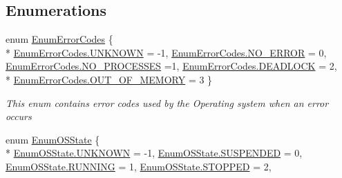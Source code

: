 \subsection*{Enumerations}
\begin{DoxyCompactItemize}
\item 
enum \hyperlink{namespace_c_p_u___o_s___simulator_1_1_operating___system_aea0b669d1bbf5690ae34ac2f8bef9470}{Enum\+Error\+Codes} \{ \\*
\hyperlink{namespace_c_p_u___o_s___simulator_1_1_operating___system_aea0b669d1bbf5690ae34ac2f8bef9470a696b031073e74bf2cb98e5ef201d4aa3}{Enum\+Error\+Codes.\+U\+N\+K\+N\+O\+W\+N} = -\/1, 
\hyperlink{namespace_c_p_u___o_s___simulator_1_1_operating___system_aea0b669d1bbf5690ae34ac2f8bef9470ad306b6fdee05fe87455110ddf6501e6c}{Enum\+Error\+Codes.\+N\+O\+\_\+\+E\+R\+R\+O\+R} = 0, 
\hyperlink{namespace_c_p_u___o_s___simulator_1_1_operating___system_aea0b669d1bbf5690ae34ac2f8bef9470a1bc8f3c5a89b2c7abbfc54ef21586aea}{Enum\+Error\+Codes.\+N\+O\+\_\+\+P\+R\+O\+C\+E\+S\+S\+E\+S} =1, 
\hyperlink{namespace_c_p_u___o_s___simulator_1_1_operating___system_aea0b669d1bbf5690ae34ac2f8bef9470a8f35b656de87c54e18710fc94d73a614}{Enum\+Error\+Codes.\+D\+E\+A\+D\+L\+O\+C\+K} = 2, 
\\*
\hyperlink{namespace_c_p_u___o_s___simulator_1_1_operating___system_aea0b669d1bbf5690ae34ac2f8bef9470ac56ddb8056b120c9d5fee05981f219c6}{Enum\+Error\+Codes.\+O\+U\+T\+\_\+\+O\+F\+\_\+\+M\+E\+M\+O\+R\+Y} = 3
 \}\begin{DoxyCompactList}\small\item\em This enum contains error codes used by the Operating system when an error occurs \end{DoxyCompactList}
\item 
enum \hyperlink{namespace_c_p_u___o_s___simulator_1_1_operating___system_a03a98a403abc737c106a8f92db5bffc1}{Enum\+O\+S\+State} \{ \\*
\hyperlink{namespace_c_p_u___o_s___simulator_1_1_operating___system_a03a98a403abc737c106a8f92db5bffc1a696b031073e74bf2cb98e5ef201d4aa3}{Enum\+O\+S\+State.\+U\+N\+K\+N\+O\+W\+N} = -\/1, 
\hyperlink{namespace_c_p_u___o_s___simulator_1_1_operating___system_a03a98a403abc737c106a8f92db5bffc1a0cb707127aebaa0023eb38363993843a}{Enum\+O\+S\+State.\+S\+U\+S\+P\+E\+N\+D\+E\+D} = 0, 
\hyperlink{namespace_c_p_u___o_s___simulator_1_1_operating___system_a03a98a403abc737c106a8f92db5bffc1a43491564ebcfd38568918efbd6e840fd}{Enum\+O\+S\+State.\+R\+U\+N\+N\+I\+N\+G} = 1, 
\hyperlink{namespace_c_p_u___o_s___simulator_1_1_operating___system_a03a98a403abc737c106a8f92db5bffc1a09d4d696b4e935115b9313e3c412509a}{Enum\+O\+S\+State.\+S\+T\+O\+P\+P\+E\+D} = 2, 

\end{DoxyCompactItemize}
